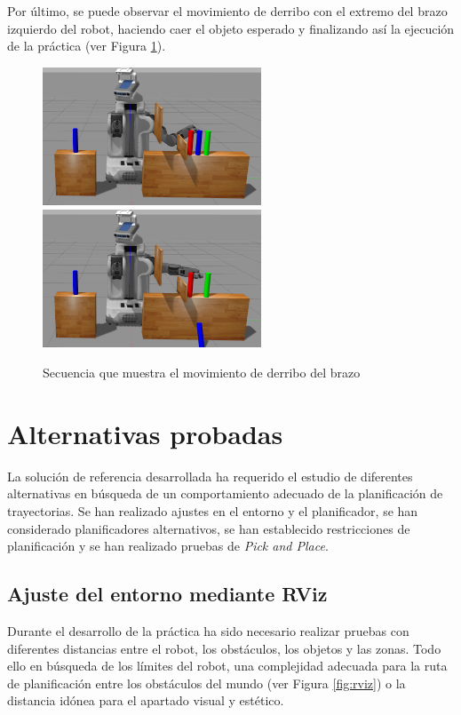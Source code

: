 \documentclass[12pt,spanish,chapterprefix, numbers=noenddot]{book}
\numberwithin{equation}{section}
\numberwithin{figure}{section}
\begin{document}
Por último, se puede observar el movimiento de derribo con el extremo del brazo izquierdo del robot, haciendo caer el objeto esperado y finalizando así la ejecución de la práctica (ver Figura \ref{fig:fase5}). 
\newpage
\begin{figure}[hbt!]
\centering
\includegraphics[width=6.5cm]{Figs/frame1910.png}
\includegraphics[width=6.5cm]{Figs/frame2264.png}
\par
\caption{\label{fig:fase5}Secuencia que muestra el movimiento de derribo del brazo}
\end{figure}

\section{Alternativas probadas}
La solución de referencia desarrollada ha requerido el estudio de diferentes alternativas en búsqueda de un comportamiento adecuado de la planificación de trayectorias. Se han realizado ajustes en el entorno y el planificador, se han considerado planificadores alternativos, se han establecido restricciones de planificación y se han realizado pruebas de \textit{Pick and Place}.  

\subsection{Ajuste del entorno mediante RViz}

Durante el desarrollo de la práctica ha sido necesario realizar pruebas con diferentes distancias entre el robot, los obstáculos, los objetos y las zonas. Todo ello en búsqueda de los límites del robot, una complejidad adecuada para la ruta de planificación entre los obstáculos del mundo (ver Figura \ref{fig:rviz}) o la distancia idónea para el apartado visual y estético. 
\end{document}
